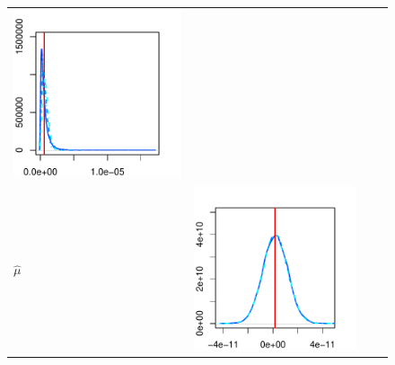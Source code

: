 \documentclass[10pt]{article}
\begin{document}
\begin{figure}[h!]
\begin{tabular}{m{0.25cm}ccc}
\begin{minipage}{0.20\textwidth}
				\includegraphics[width=1\linewidth]{results-simulation-10003-bid-ask-noise-plots-PHIS-microstructure-PHI-XI-Inf-SDs-0.pdf}
				\end{minipage}  \\
%
			\begin{sideways} $\hat{\mu}$ \end{sideways}
			& \begin{minipage}{0.20\textwidth}
				\centering
				\includegraphics[width=1\linewidth]{results-simulation-10003-bid-ask-noise-plots-MUS-microstructure-MU-XI-0-SDs-0.pdf}

\end{minipage}
\end{tabular}
\end{figure}
\end{document}
